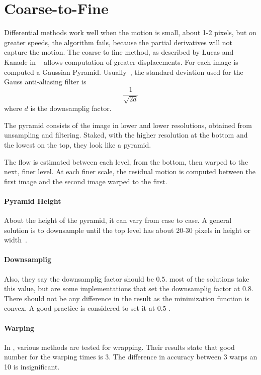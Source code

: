 \documentclass[12pt,a4paper,twoside]{report}
\begin{document}
\section{Coarse-to-Fine}
Differential methods work well when the motion is small, about 1-2 pixels, but on greater speeds, the algorithm fails, because the partial derivatives will not capture the motion.
The coarse to fine method, as described by Lucas and Kanade in ~\cite{lucas1981} allows computation of greater displacements. For each image is computed a Gaussian Pyramid. Usually~\cite{sun2010}, the standard deviation used for the Gauss anti-aliasing filter is 
\begin{equation}
	\frac{1}{\sqrt{2d}}
\end{equation} where $d$ is the downsamplig factor.

The pyramid consists of the image in lower and lower resolutions, obtained from unsampling and filtering. Staked, with the higher resolution at the bottom and the lowest on the top, they look like a pyramid.

The flow is estimated between each level, from the bottom, then warped to the next, finer level. At each finer scale, the residual motion is computed between the first image and the second image warped to the first. 

\paragraph{Pyramid Height} \label{pyrHeight} About the height of the pyramid, it can vary from case to case. A general solution is to downsample until the top level has about 20-30 pixels in height or width~\cite{sun2010}. 

\paragraph{Downsamplig}Also, they say the downsamplig factor should be $0.5$. most of the solutions take this value, but are some implementations that set the downsamplig factor at $0.8$. There should not be any difference in the result as the minimization function is convex. A good practice is considered to set it at $0.5$ \cite{sun2010}.



\paragraph{Warping}In \cite{sun2010}, various methods are tested for wrapping. Their results state that good number for the warping times is 3. The difference in accuracy between 3 warps an 10 is insignificant.
\end{document}
